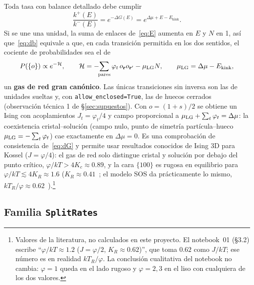 \documentclass[11pt,a4paper]{article}
\newcommand{\code}[1]{\texttt{#1}}
\newcommand{\vect}[1]{\mathbf{#1}}
\newcommand{\Ekink}{E_{\mathrm{kink}}}
\newcommand{\dmu}{\Delta\mu}
\begin{document}
Toda tasa con balance detallado debe cumplir
\begin{equation}
\frac{k^+(E)}{k^-(E)}=e^{-\Delta G(E)}=e^{\dmu+E-\Ekink}.
\label{eq:db}
\end{equation}
Si se une una unidad, la suma de enlaces de~\eqref{eq:E} aumenta en $E$ y $N$ en 1, así que~\eqref{eq:db}
equivale a que, en cada transición permitida en los dos sentidos, el cociente de probabilidades sea el de
\begin{equation}
P(\{o\})\propto e^{-\mathcal H},\qquad
\mathcal H=-\!\!\sum_{\text{pares}}\varphi_t\,o_{\vect r}o_{\vect r'}-\mu_{\rm LG}N,\qquad
\mu_{\rm LG}=\dmu-\Ekink ,
\label{eq:lg}
\end{equation}
un \textbf{gas de red gran canónico}. Las únicas transiciones sin inversa son las de unidades sueltas y,
con \code{allow\_enclosed=True}, las de huecos cerrados (observación técnica 1 de \S\ref{sec:supuestos}). Con $o=(1+s)/2$ se obtiene un Ising con acoplamientos
$J_t=\varphi_t/4$ y campo proporcional a $\mu_{\rm LG}+\sum_t\varphi_t=\dmu$: la coexistencia
cristal--solución (campo nulo, punto de simetría partícula--hueco $\mu_{\rm LG}=-\sum_t\varphi_t$)
cae exactamente en $\dmu=0$. Es una comprobación de consistencia de~\eqref{eq:dG} y permite usar
resultados conocidos de Ising 3D para Kossel ($J=\varphi/4$): el gas de red solo distingue cristal y
solución por debajo del punto crítico, $\varphi/kT>4K_c\approx0.89$, y la cara $\{100\}$ es rugosa en
equilibrio para $\varphi/kT\lesssim4K_R\approx1.6$ ($K_R\approx0.41$~\cite{hasenbusch1996}; el modelo
SOS da prácticamente lo mismo, $kT_R/\varphi\approx0.62$~\cite{weeks1979}).\footnote{Valores de la
literatura, no calculados en este proyecto. El notebook~01 (\S3.2) escribe ``$\varphi/kT\approx1.2$
($J=\varphi/2$, $K_R\approx0.62$)'', que toma $0.62$ como $J/kT$; ese número es en realidad $kT_R/\varphi$.
La conclusión cualitativa del notebook no cambia: $\varphi=1$ queda en el lado rugoso y $\varphi=2,3$ en
el liso con cualquiera de los dos valores.}

\subsection{Familia \texorpdfstring{\code{SplitRates}}{SplitRates}}
\end{document}
